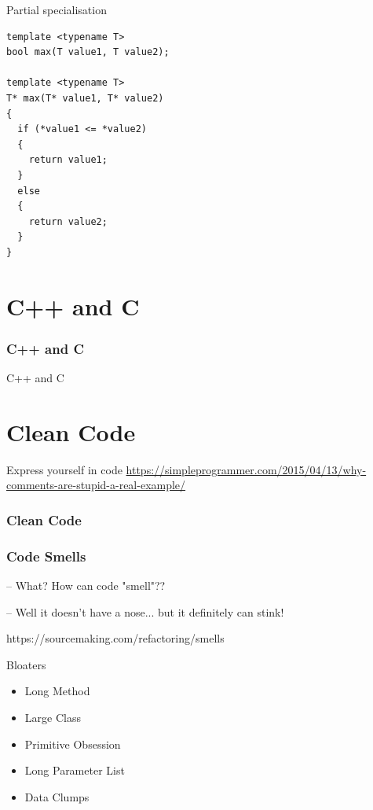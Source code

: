 \documentclass{beamer}
\begin{document}
\begin{frame}[fragile]{Partial specialisation}
\begin{lstlisting}
template <typename T>
bool max(T value1, T value2);

template <typename T>
T* max(T* value1, T* value2)
{
  if (*value1 <= *value2)
  {
    return value1;
  } 
  else
  {
    return value2;
  }
}

\end{lstlisting}
\end{frame}

\part{C++ and C}
\section{C++ and C}
\begin{frame}{C++ and C}
\end{frame}


\part{Clean Code}
\begin{frame}{Express yourself in code}
\url{https://simpleprogrammer.com/2015/04/13/why-comments-are-stupid-a-real-example/}
\end{frame}

\section{Clean Code}

\section{Code Smells}
\begin{frame}
    – What? How can code "smell"??

    – Well it doesn't have a nose... but it definitely can stink!

https://sourcemaking.com/refactoring/smells
\end{frame}

\begin{frame}{Bloaters}
\begin{itemize}
  \item Long Method
  \item Large Class
  \item Primitive Obsession
  \item Long Parameter List
  \item Data Clumps
\end{itemize}
\end{frame}
\end{document}
